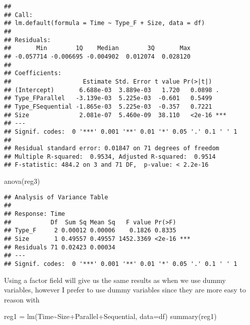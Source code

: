 \documentclass[
]{article}
\newenvironment{Shaded}{\begin{snugshade}}{\end{snugshade}}
\newcommand{\AttributeTok}[1]{\textcolor[rgb]{0.77,0.63,0.00}{#1}}
\newcommand{\FunctionTok}[1]{\textcolor[rgb]{0.00,0.00,0.00}{#1}}
\newcommand{\NormalTok}[1]{#1}
\newcommand{\OtherTok}[1]{\textcolor[rgb]{0.56,0.35,0.01}{#1}}
\newcommand{\SpecialCharTok}[1]{\textcolor[rgb]{0.00,0.00,0.00}{#1}}
\begin{document}
\begin{verbatim}
## 
## Call:
## lm.default(formula = Time ~ Type_F + Size, data = df)
## 
## Residuals:
##       Min        1Q    Median        3Q       Max 
## -0.057714 -0.006695 -0.004902  0.012074  0.028120 
## 
## Coefficients:
##                    Estimate Std. Error t value Pr(>|t|)    
## (Intercept)       6.688e-03  3.889e-03   1.720   0.0898 .  
## Type_FParallel   -3.139e-03  5.225e-03  -0.601   0.5499    
## Type_FSequential -1.865e-03  5.225e-03  -0.357   0.7221    
## Size              2.081e-07  5.460e-09  38.110   <2e-16 ***
## ---
## Signif. codes:  0 '***' 0.001 '**' 0.01 '*' 0.05 '.' 0.1 ' ' 1
## 
## Residual standard error: 0.01847 on 71 degrees of freedom
## Multiple R-squared:  0.9534, Adjusted R-squared:  0.9514 
## F-statistic: 484.2 on 3 and 71 DF,  p-value: < 2.2e-16
\end{verbatim}

\begin{Shaded}
\begin{Highlighting}[]
\FunctionTok{anova}\NormalTok{(reg3)}
\end{Highlighting}
\end{Shaded}

\begin{verbatim}
## Analysis of Variance Table
## 
## Response: Time
##           Df  Sum Sq Mean Sq   F value Pr(>F)    
## Type_F     2 0.00012 0.00006    0.1826 0.8335    
## Size       1 0.49557 0.49557 1452.3369 <2e-16 ***
## Residuals 71 0.02423 0.00034                     
## ---
## Signif. codes:  0 '***' 0.001 '**' 0.01 '*' 0.05 '.' 0.1 ' ' 1
\end{verbatim}

Using a factor field will give us the same results as when we use dummy
variables, however I prefer to use dummy variables since they are more
easy to reason with

\begin{Shaded}
\begin{Highlighting}[]
\NormalTok{reg1 }\OtherTok{=} \FunctionTok{lm}\NormalTok{(Time}\SpecialCharTok{\textasciitilde{}}\NormalTok{Size}\SpecialCharTok{+}\NormalTok{Parallel}\SpecialCharTok{+}\NormalTok{Sequential, }\AttributeTok{data=}\NormalTok{df)}
\FunctionTok{summary}\NormalTok{(reg1)}
\end{Highlighting}
\end{Shaded}
\end{document}
